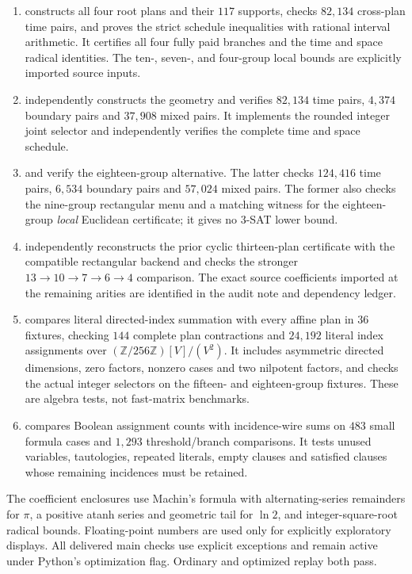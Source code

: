 \begin{enumerate}
\item {} constructs all four root plans and
their $117$ supports, checks $82{,}134$ cross-plan time pairs, and proves
the strict schedule inequalities with rational interval arithmetic.
It certifies all four fully paid branches and the time and space radical
identities. The ten-, seven-, and four-group local bounds are explicitly
imported source inputs.
\item {} independently constructs the
geometry and verifies $82{,}134$ time pairs, $4{,}374$ boundary pairs and
$37{,}908$ mixed pairs. It implements the rounded integer joint selector
and independently verifies the complete time and space schedule.
\item {} and
 verify the eighteen-group alternative.
The latter checks $124{,}416$ time pairs, $6{,}534$ boundary pairs and
$57{,}024$ mixed pairs. The former also checks the nine-group rectangular
menu and a matching witness for the eighteen-group \emph{local} Euclidean
certificate; it gives no 3-SAT lower bound.
\item {} independently reconstructs the
prior cyclic thirteen-plan certificate with the compatible rectangular
backend and checks the stronger $13\to10\to7\to6\to4$ comparison.
The exact source coefficients imported at the remaining arities are
identified in the audit note and dependency ledger.
\item {} compares literal directed-index
summation with every affine plan in $36$ fixtures, checking $144$ complete
plan contractions and $24{,}192$ literal index assignments over
$(\mathbb Z/256\mathbb Z)[V]/(V^2)$. It includes asymmetric directed
dimensions, zero factors, nonzero cases and two nilpotent factors, and
checks the actual integer selectors on the fifteen- and eighteen-group
fixtures. These are algebra tests, not fast-matrix benchmarks.
\item {} compares Boolean assignment
counts with incidence-wire sums on $483$ small formula cases and
$1{,}293$ threshold/branch comparisons. It tests unused variables,
tautologies, repeated literals, empty clauses and satisfied clauses whose
remaining incidences must be retained.
\end{enumerate}

The coefficient enclosures use Machin's formula with alternating-series
remainders for $\pi$, a positive atanh series and geometric tail for
$\ln2$, and integer-square-root radical bounds. Floating-point numbers
are used only for explicitly exploratory displays. All delivered main
checks use explicit exceptions and remain active under Python's
optimization flag. Ordinary and optimized replay both pass.

